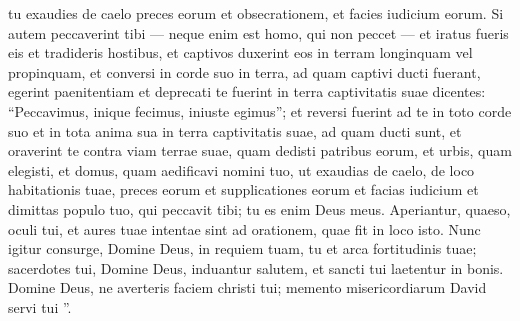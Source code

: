 \begin{biblechapter}
\begin{biblechapter}
\begin{biblechapter}
\begin{biblechapter}
\begin{biblechapter}
\begin{biblechapter}
\verse tu exaudies de caelo preces eorum et obsecrationem, et facies iudicium eorum.
 \verse Si autem peccaverint tibi — neque enim est homo, qui non peccet — et iratus fueris eis et tradideris hostibus, et captivos duxerint eos in terram longinquam vel propinquam, 
\verse et conversi in corde suo in terra, ad quam captivi ducti fuerant, egerint paenitentiam et deprecati te fuerint in terra captivitatis suae dicentes: “Peccavimus, inique fecimus, iniuste egimus”; 
\verse et reversi fuerint ad te in toto corde suo et in tota anima sua in terra captivitatis suae, ad quam ducti sunt, et oraverint te contra viam terrae suae, quam dedisti patribus eorum, et urbis, quam elegisti, et domus, quam aedificavi nomini tuo, 
 \verse ut exaudias de caelo, de loco habitationis tuae, preces eorum et supplicationes eorum et facias iudicium et dimittas populo tuo, qui peccavit tibi; 
\verse tu es enim Deus meus. Aperiantur, quaeso, oculi tui, et aures tuae intentae sint ad orationem, quae fit in loco isto.
 \verse Nunc igitur consurge, Domine Deus, in requiem tuam, tu et arca fortitudinis tuae; sacerdotes tui, Domine Deus, induantur salutem, et sancti tui laetentur in bonis. 
\verse Domine Deus, ne averteris faciem christi tui; memento misericordiarum David servi tui ”.
 

\end{biblechapter}
\end{biblechapter}
\end{biblechapter}
\end{biblechapter}
\end{biblechapter}
\end{biblechapter}
